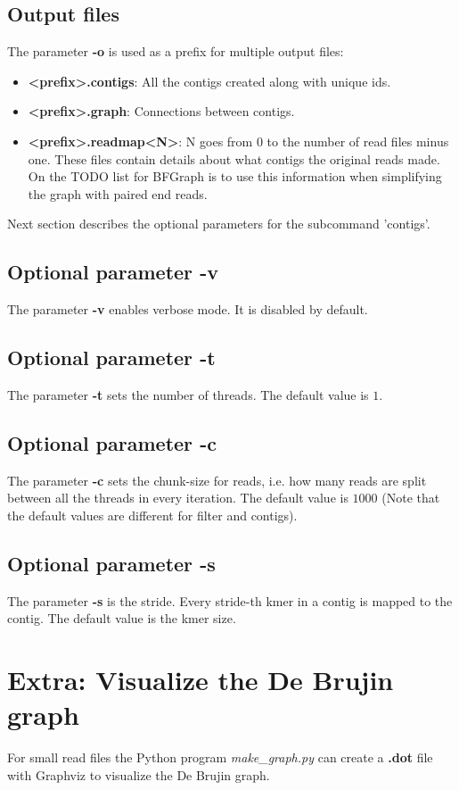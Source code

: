 \documentclass[a4paper]{report}
\renewcommand{\b}[1]{\textbf{#1}}  %
\newcommand{\e}[1]{\emph{#1}}    %
\begin{document}
\subsection{Output files}\label{outputfiles}
The parameter \b{-o} is used as a prefix for multiple output files:

\begin{itemize}
\item \b{<prefix>.contigs}: All the contigs created along with unique ids.
\item \b{<prefix>.graph}: Connections between contigs.
\item \b{<prefix>.readmap<N>}: N goes from 0 to the number of read files minus one. These files contain details
about what contigs the original reads made. On the TODO list for BFGraph is to use this information when simplifying the
graph with paired end reads.
\end{itemize}

Next section describes the optional parameters for the subcommand 'contigs'.

\subsection{Optional parameter \b{-v}}
The parameter \b{-v} enables verbose mode. It is disabled by default.
\subsection{Optional parameter \b{-t}}
The parameter \b{-t} sets the number of threads. The default value is $1$.
\subsection{Optional parameter \b{-c}}
The parameter \b{-c} sets the chunk-size for reads, i.e. how many reads are split between all the threads in every iteration. 
The default value is $1000$ (Note that the default values are different for filter and contigs).
\subsection{Optional parameter \b{-s}}
The parameter \b{-s} is the stride. Every stride-th kmer in a contig is mapped to the contig. The default value is the kmer size. 


\section{Extra: Visualize the De Brujin graph}
For small read files the Python program \e{make\_graph.py} can create a \b{.dot} file with Graphviz\cite{graphviz} 
to visualize the De Brujin graph.
\end{document}
